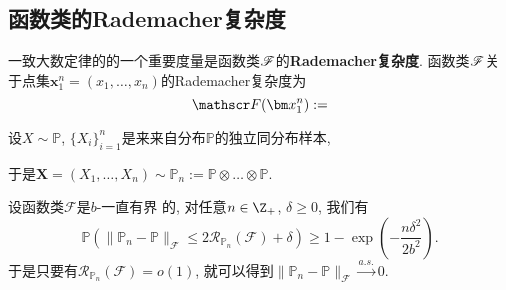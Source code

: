 \subsection{函数类的Rademacher复杂度}

一致大数定律的的一个重要度量是函数类$\mathscr{F}$的\textbf{Rademacher复杂度}. 
函数类$\mathscr{F}$关于点集$\bm x_1^n = (x_1, \dots, x_n)$的Rademacher复杂度为
\begin{equation*}
	\sF(\bm x_1^n) := 
\end{equation*}

设$X \sim \mathbb{P}$, $\{X_i\}_{i=1}^n$是来来自分布$\mathbb{P}$的独立同分布样本, 


于是$\bm X = (X_1, \dots, X_n) \sim \mathbb{P}_n := \mathbb{P} \otimes \dots \otimes \mathbb{P}$. 

\begin{theorem}
	设函数类$\mathscr{F}$是$b$-一直有界	的, 对任意$n \in \Z_+$, $\delta \geq 0$, 我们有
	\begin{equation*}
		\mathbb{P} \left( \|\mathbb{P}_n - \mathbb{P}\|_{\mathscr{F}} \leq 2 \mathcal{R}_{\mathbb{P}_n}(\mathscr{F}) + \delta \right)
		\geq 1 - \exp \left(- \frac{n \delta^2}{2 b^2} \right). 
	\end{equation*}
	于是只要有$\mathcal{R}_{\mathbb{P}_n}(\mathscr{F}) = o(1)$, 就可以得到$\|\mathbb{P}_n - \mathbb{P}\|_{\mathscr{F}} \stackrel{a.s.}{\to} 0$. 
\end{theorem}
